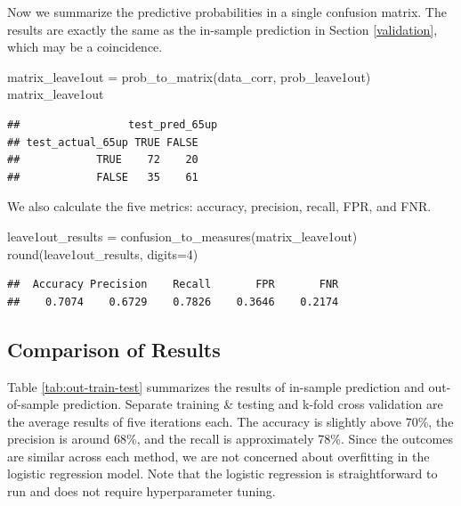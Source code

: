 \documentclass[
]{article}
\newenvironment{Shaded}{\begin{snugshade}}{\end{snugshade}}
\newcommand{\AttributeTok}[1]{\textcolor[rgb]{0.77,0.63,0.00}{#1}}
\newcommand{\DecValTok}[1]{\textcolor[rgb]{0.00,0.00,0.81}{#1}}
\newcommand{\FunctionTok}[1]{\textcolor[rgb]{0.00,0.00,0.00}{#1}}
\newcommand{\NormalTok}[1]{#1}
\newcommand{\OtherTok}[1]{\textcolor[rgb]{0.56,0.35,0.01}{#1}}
\begin{document}
Now we summarize the predictive probabilities in a single confusion
matrix. The results are exactly the same as the in-sample prediction in
Section \ref{validation}, which may be a coincidence.

\begin{Shaded}
\begin{Highlighting}[]
\NormalTok{matrix\_leave1out }\OtherTok{=} \FunctionTok{prob\_to\_matrix}\NormalTok{(data\_corr, prob\_leave1out)}
\NormalTok{matrix\_leave1out}
\end{Highlighting}
\end{Shaded}

\begin{verbatim}
##                 test_pred_65up
## test_actual_65up TRUE FALSE
##            TRUE    72    20
##            FALSE   35    61
\end{verbatim}

We also calculate the five metrics: accuracy, precision, recall, FPR,
and FNR.

\begin{Shaded}
\begin{Highlighting}[]
\NormalTok{leave1out\_results }\OtherTok{=} \FunctionTok{confusion\_to\_measures}\NormalTok{(matrix\_leave1out)}
\FunctionTok{round}\NormalTok{(leave1out\_results, }\AttributeTok{digits=}\DecValTok{4}\NormalTok{)}
\end{Highlighting}
\end{Shaded}

\begin{verbatim}
##  Accuracy Precision    Recall       FPR       FNR 
##    0.7074    0.6729    0.7826    0.3646    0.2174
\end{verbatim}

\hypertarget{cmp-results}{%
\subsection{Comparison of Results}\label{cmp-results}}

Table \ref{tab:out-train-test} summarizes the results of in-sample
prediction and out-of-sample prediction. Separate training \& testing
and k-fold cross validation are the average results of five iterations
each. The accuracy is slightly above 70\%, the precision is around 68\%,
and the recall is approximately 78\%. Since the outcomes are similar
across each method, we are not concerned about overfitting in the
logistic regression model. Note that the logistic regression is
straightforward to run and does not require hyperparameter tuning.
\end{document}
